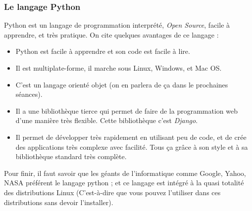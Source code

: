 \documentclass[12pt]{article}
\begin{document}
        \subsubsection{Le langage Python}
            Python est un langage de programmation interprété, \emph{Open Source}, facile à apprendre, 
            et très pratique. On cite quelques avantages de ce langage :
            \begin{itemize}
                \item Python est facile à apprendre et son code est facile à lire.
                \item Il est multiplate-forme, il marche sous Linux, Windows, et Mac OS.
                \item C'est un langage orienté objet (on en parlera de ça dans le prochaines séances).
                \item Il a une bibliothèque tierce qui permet de faire de la programmation web d'une manière très flexible.
                    Cette bibliothèque c'est \emph{Django}.
                \item Il permet de développer très rapidement en utilisant peu de code, et de crée des applications 
                    très complexe avec facilité. Tous ça grâce à son style et à sa bibliothèque standard très complète.
            \end{itemize}

            Pour finir, il faut savoir que les géants de l'informatique comme Google, Yahoo, NASA préférent le langage
            python ; et ce langage est intégré à la quasi totalité des distributions Linux (C'est-à-dire que vous pouvez l'utiliser
            dans ces distributions sans devoir l'installer).

\end{document}
